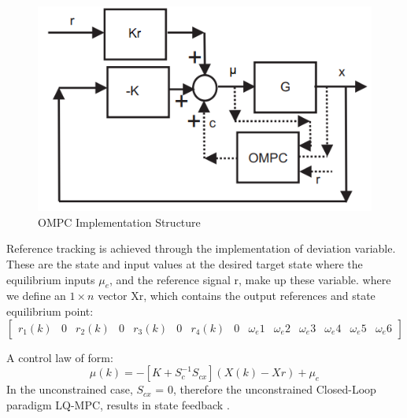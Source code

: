 \documentclass[12pt,a4paper,twoside]{report}
\begin{document}
				\begin{figure}[h!]
					\centering
					\includegraphics[width=0.8\linewidth]{OMPC2.png}
					\caption{OMPC Implementation Structure}
					\label{fig:ompcimplementationstructure}
				\end{figure}
				Reference tracking is achieved through the implementation of deviation variable. These are the state and input values at the desired target state where the equilibrium inputs $\mu_e$, and the reference signal r, make up these variable. where we define an $1 \times n$ vector Xr, which contains the output references and state equilibrium point:
				\begin{equation}
					\begin{bmatrix}
						r_1(k)&0&r_2(k)&0&r_3(k)&0&r_4(k)&0&\omega_e1&\omega_e2&\omega_e3&\omega_e4&\omega_e5&\omega_e6
					\end{bmatrix}
				\end{equation}
				
				A control law of form:
				\begin{equation}
					\mu(k) = - [K + S_c^{-1}S_{cx}]( X(k)- Xr) + \mu_e
				\end{equation}
				In the unconstrained case, $S_{cx}$ = 0, therefore the unconstrained Closed-Loop paradigm LQ-MPC, results in state feedback \cite{26}.
				
\end{document}
